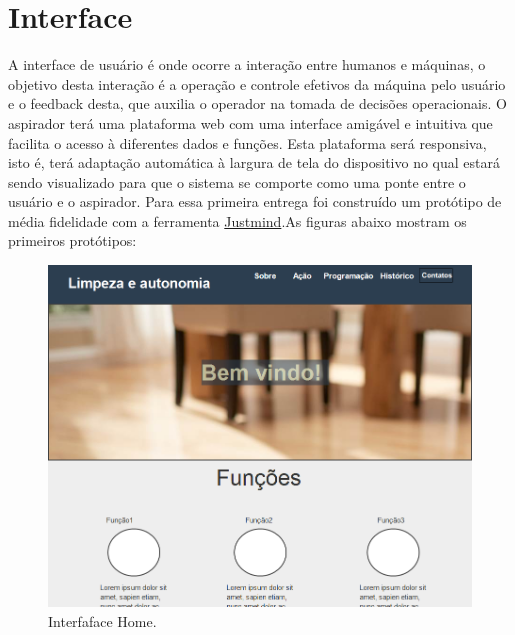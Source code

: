 \section{Interface} %
\label{sub:interface}
  A interface de usuário é onde ocorre a interação entre humanos e máquinas, o
objetivo desta interação é a operação e controle efetivos da máquina pelo usuário e o
feedback desta, que auxilia o operador na tomada de decisões operacionais.
O aspirador terá uma plataforma web com uma interface amigável e intuitiva que facilita o acesso à diferentes dados e funções. Esta plataforma será responsiva, isto é, terá adaptação automática à largura de tela do dispositivo no qual estará sendo visualizado para que o sistema se comporte como uma ponte entre o usuário e o aspirador.
Para essa primeira entrega foi construído um protótipo de média fidelidade com
a ferramenta \href{http://www.justinmind.com/}{Justmind}.As figuras abaixo mostram os primeiros protótipos:

\begin{figure}[H]                                    
  \centering                                         
  \includegraphics[scale=0.4]{figuras/home.png}
  \caption{Interfaface Home.}                        
  \label{img:inter_home}                              
\end{figure}                                         


